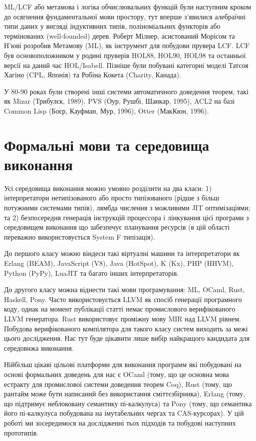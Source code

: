 ML/LCF або метамова і логіка обчислювальних функцій були наступним кроком до
осягнення фундаментальної мови простору, тут вперше з'явилися алебраїчні типи даних
у вигляді індуктивних типів, поліноміальних функторів або термінованих (well-founded) дерев.
Роберт Мілнер, асистований Морісом та Н'юві розробив Метамову (ML), як
інструмент для побудови прувера LCF. LCF був основоположником у родині пруверів
HOL88, HOL90, HOL98 та останньої версії на даний час HOL/Isabell.
Пізніше були побувані категорні моделі Татсоя Хагіно (CPL, Японія)
та Робіна Кокета (Charity, Канада).

У 80-90 роках були створені інші системи автоматичного доведення теорем,
такі як Mizar (Трибулєк, 1989). PVS (Оур, Рушбі, Шанкар, 1995),
ACL2 на базі Common Lisp (Боєр, Кауфман, Мур, 1996), Otter (МакКюн, 1996).

\section{Формальні мови та середовища виконання}
Усі середовища виконання можно умовно розділити на два класи:
1) інтерпретатори нетипізованого або просто
типізованого (рідше з більш потужними системами типів),
лямбда числення з можливими JIT оптимізаціями; та 2)
безпосередня генерація інструкцій процессора і лінкування цієї програми з
середовищем виконання що забезпечує планування ресурсів
(в цій області переважно використовується System F типізація).

До першого класу можно віндеси такі віртуалні машини та інтерпретатори як
Erlang (BEAM), JavaScript (V8), Java (HotSpot), K (Kx), PHP (HHVM), Python (PyPy), LuaJIT
та багато інших інтерпретаторів.

До другого класу можна віднести такі мови програмування: ML, OCaml, Rust,
Haskell, Pony. Часто використовується LLVM як спосіб генерації програмного коду,
однак на момент публікації статті немає промислового верифікованого LLVM генератора.
Rust використовує проміжну мову MIR над LLVM рівнем. Побудова верифікованого компілятора
для такого класу систем виходить за межі цього дослідження. Нас тут буде цікавити
лише вибір найкращого кандидата для середовижа виконання.

Нійбільш цікаві цільові платформи для виконання программ
які побудовані на основі формальних доведень для нас є OCaml (тому,
що це основна мова естракту для промислової системи доведення теорем Coq),
Rust (тому, що рантайм може бути написаний без використання сміттєзбірника),
Erlang (тому, що підтримує неблоковану семантику пі-калкулуса)
та Pony (тому, що семантика його пі-калкулуса побудована на імутабельних чергах та CAS-курсорах).
У цій роботі ми зосередимося на дослідженні тьох підходів та побудові наступних прототипів.

